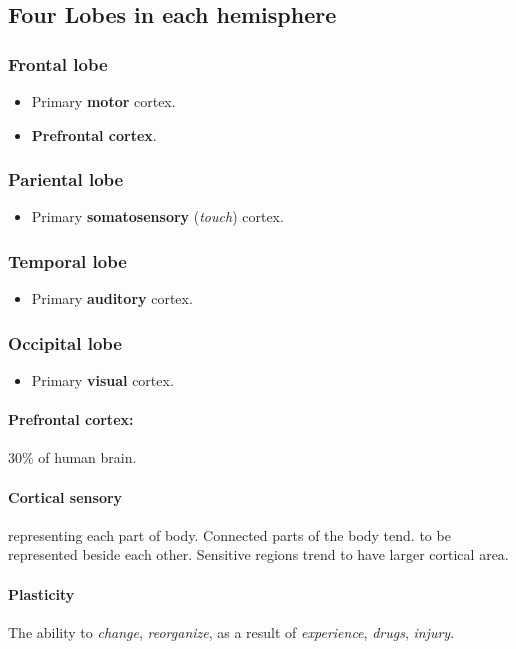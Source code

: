 \documentclass{article}
\begin{document}
	\subsection{Four Lobes in each hemisphere}
	\subsubsection{Frontal lobe}
		\begin{itemize}
			\item Primary \textbf{motor} cortex.
			\item \textbf{Prefrontal cortex}.
		\end{itemize}
	\subsubsection{Pariental lobe}
		\begin{itemize}
			\item Primary \textbf{somatosensory} (\emph{touch}) cortex.
		\end{itemize}
	\subsubsection{Temporal lobe}
		\begin{itemize}
			\item Primary \textbf{auditory} cortex.
		\end{itemize}
	\subsubsection{Occipital lobe}
		\begin{itemize}
			\item Primary \textbf{visual} cortex.
		\end{itemize}
	\paragraph{Prefrontal cortex:} 30\% of human brain.
	\paragraph{Cortical sensory} representing each part of body. Connected parts of the body tend. to be represented beside each other. Sensitive regions trend to have larger cortical area.
	\paragraph{Plasticity} The ability to \emph{change}, \emph{reorganize}, as a result of \emph{experience}, \emph{drugs}, \emph{injury}.
\end{document}
